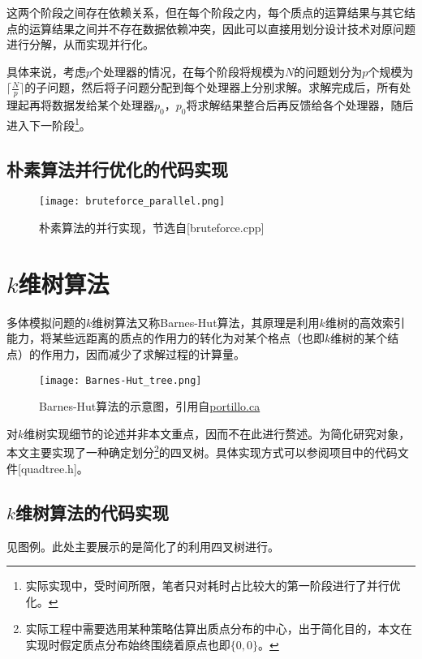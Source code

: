 \documentclass[lang=cn,11pt,a4paper,cite=authoryear]{elegantpaper}
\begin{document}
这两个阶段之间存在依赖关系，但在每个阶段之内，每个质点的运算结果与其它结点的运算结果之间并不存在数据依赖冲突，因此可以直接用划分设计技术对原问题进行分解，从而实现并行化。

具体来说，考虑$p$个处理器的情况，在每个阶段将规模为$N$的问题划分为$p$个规模为$\lceil  \frac{N}{p}\rceil$的子问题，然后将子问题分配到每个处理器上分别求解。求解完成后，所有处理起再将数据发给某个处理器$p_0$，$p_0$将求解结果整合后再反馈给各个处理器，随后进入下一阶段\footnote{实际实现中，受时间所限，笔者只对耗时占比较大的第一阶段进行了并行优化。}。

\subsection{朴素算法并行优化的代码实现}

\begin{figure}[htbp]
  \centering
  \texttt{[image: bruteforce\_parallel.png]}
  \caption{朴素算法的并行实现，节选自[bruteforce.cpp]}
\end{figure}

\newpage

\section{$k$维树算法}

多体模拟问题的$k$维树算法又称Barnes-Hut算法，其原理是利用$k$维树的高效索引能力，将某些远距离的质点的作用力的转化为对某个格点（也即$k$维树的某个结点）的作用力，因而减少了求解过程的计算量。

\begin{figure}[htbp]
  \centering
  \texttt{[image: Barnes-Hut\_tree.png]}
  \caption{Barnes-Hut算法的示意图，引用自\href{http://portillo.ca/nbody/barnes-hut/}{portillo.ca}}
\end{figure}

对$k$维树实现细节的论述并非本文重点，因而不在此进行赘述。为简化研究对象，本文主要实现了一种确定划分\footnote{实际工程中需要选用某种策略估算出质点分布的中心，出于简化目的，本文在实现时假定质点分布始终围绕着原点也即$\{0,0\}$。}的四叉树。具体实现方式可以参阅项目中的代码文件[quadtree.h]。

\subsection{$k$维树算法的代码实现}

见图例。此处主要展示的是简化了的利用四叉树进行。
\end{document}
